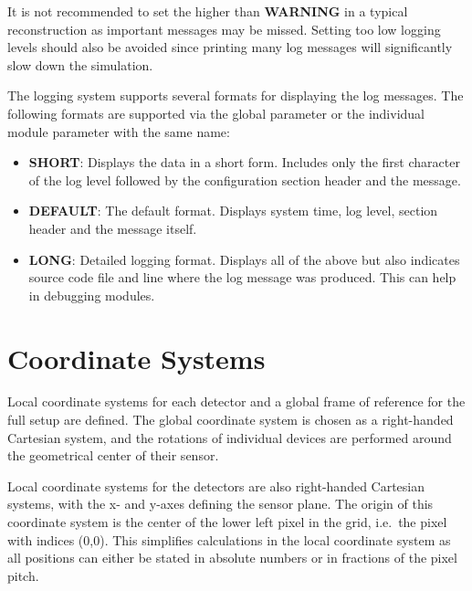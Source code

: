 \begin{warning}
    It is not recommended to set the  higher than \textbf{WARNING} in a typical reconstruction as important messages may be missed.
    Setting too low logging levels should also be avoided since printing many log messages will significantly slow down the simulation.
\end{warning}

The logging system supports several formats for displaying the log messages.
The following formats are supported via the global parameter  or the individual module parameter with the same name:
\begin{itemize}
\item \textbf{SHORT}: Displays the data in a short form.
Includes only the first character of the log level followed by the configuration section header and the message.
\item \textbf{DEFAULT}: The default format.
Displays system time, log level, section header and the message itself.
\item \textbf{LONG}: Detailed logging format.
Displays all of the above but also indicates source code file and line where the log message was produced.
This can help in debugging modules.
\end{itemize}

\section{Coordinate Systems}
\label{sec:coordinate_systems}

Local coordinate systems for each detector and a global frame of reference for the full setup are defined.
The global coordinate system is chosen as a right-handed Cartesian system, and the rotations of individual devices are performed around the geometrical center of their sensor.

Local coordinate systems for the detectors are also right-handed Cartesian systems, with the x- and y-axes defining the sensor plane.
The origin of this coordinate system is the center of the lower left pixel in the grid, i.e.\ the pixel with indices (0,0).
This simplifies calculations in the local coordinate system as all positions can either be stated in absolute numbers or in fractions of the pixel pitch.
